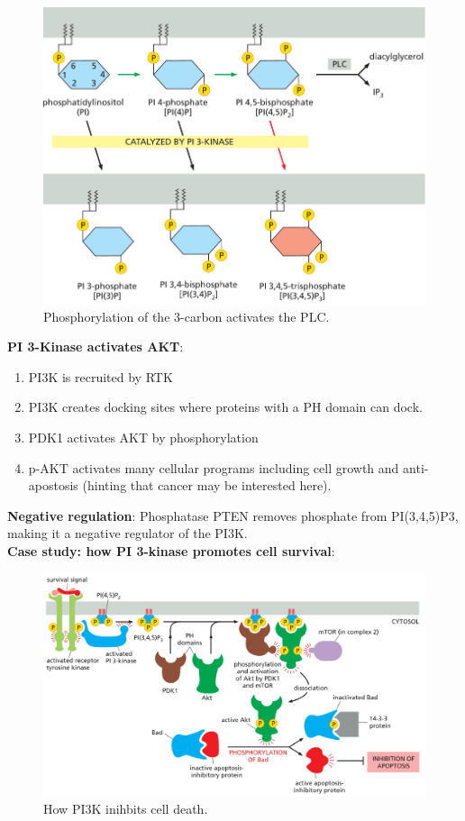 \documentclass[../main.tex]{subfiles}
\begin{document}
\begin{figure}[H]
	\centering
	\includegraphics[height=0.3\linewidth]{PI3_phos}
	\caption{Phosphorylation of the 3-carbon activates the PLC.}
\end{figure}

\textbf{PI 3-Kinase activates AKT}:
\begin{enumerate}
	\item PI3K is recruited by RTK
	\item PI3K creates docking sites where proteins with a PH domain can dock.
	\item PDK1 activates AKT by phosphorylation
	\item p-AKT activates many cellular programs including cell growth and anti-apostosis (hinting that cancer may be interested here).
\end{enumerate}


\textbf{Negative regulation}: Phosphatase PTEN removes phosphate from PI(3,4,5)P3, making it a negative regulator of the PI3K. \\

\textbf{Case study: how PI 3-kinase promotes cell survival}:
\begin{figure}[H]
	\centering
	\includegraphics[height=0.4\textheight]{PI3_surv}
	\caption{How PI3K inihbits cell death.}
\end{figure}
\end{document}
